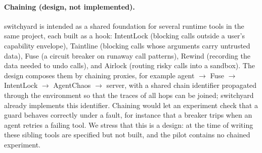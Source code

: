 \paragraph{Chaining (design, not implemented).} switchyard is intended as a shared foundation for several runtime tools in the same project, each built as a hook: IntentLock (blocking calls outside a user's capability envelope), Taintline (blocking calls whose arguments carry untrusted data), Fuse (a circuit breaker on runaway call patterns), Rewind (recording the data needed to undo calls), and Airlock (routing risky calls into a sandbox). The design composes them by chaining proxies, for example agent $\to$ Fuse $\to$ IntentLock $\to$ AgentChaos $\to$ server, with a shared chain identifier propagated through the environment so that the traces of all hops can be joined; switchyard already implements this identifier. Chaining would let an experiment check that a guard behaves correctly under a fault, for instance that a breaker trips when an agent retries a failing tool. We stress that this is a design: at the time of writing these sibling tools are specified but not built, and the pilot contains no chained experiment.
